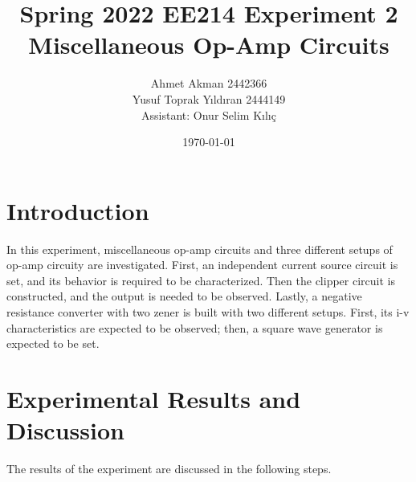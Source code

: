 \documentclass[letterpaper,12pt]{article}
\begin{document}
\thispagestyle{empty}

\title{Spring 2022 EE214 Experiment 2  \protect\\ Miscellaneous Op-Amp Circuits}
\author{Ahmet Akman 2442366 \protect\\ Yusuf Toprak Yıldıran 2444149 \protect\\ Assistant: Onur Selim Kılıç}
\date{\today}
\maketitle
\tableofcontents
\section{Introduction}
In this experiment, miscellaneous op-amp circuits and three different setups of op-amp circuity are investigated. First, an independent current source circuit is set, and its behavior is required to be characterized. Then the clipper circuit is constructed, and the output is needed to be observed. Lastly, a negative resistance converter with two zener is built with two different setups. First, its i-v characteristics are expected to be observed; then, a square wave generator is expected to be set.
\section{Experimental Results and Discussion}
The results of the experiment are discussed in the following steps.
\end{document}
